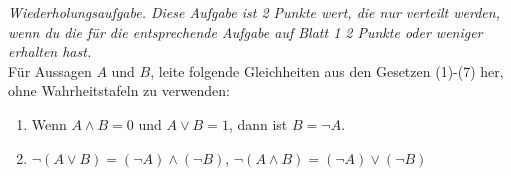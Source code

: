 \begin{prob}
  \textit{Wiederholungsaufgabe. Diese Aufgabe ist 2 Punkte wert, die nur
    verteilt werden, wenn du die für die entsprechende Aufgabe auf Blatt 1 2
    Punkte oder weniger erhalten hast.} \\
  Für Aussagen $A$ und $B$, leite folgende Gleichheiten aus den Gesetzen (1)-(7)
  her, ohne Wahrheitstafeln zu verwenden:
  \begin{enumerate}
  \item Wenn $A \land B = 0$ und $A \lor B = 1$, dann ist $B = \neg A$.
  \item $\neg (A \lor B) = (\neg A) \land (\neg B)$, $\neg (A \land B) = (\neg
    A) \lor (\neg B)$
  \end{enumerate}
\end{prob}
